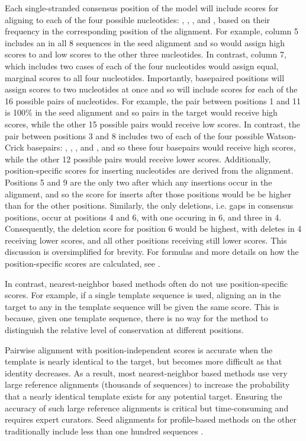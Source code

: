 Each single-stranded consensus position of the model will include
scores for aligning to each of the four possible nucleotides:
, , , and , based on their frequency
in the corresponding position of the alignment. For example, column 5
includes an  in all 8 sequences in the seed alignment and so
would assign high scores to  and low scores to the other three
nucleotides. In contrast, column 7, which includes two cases of each
of the four nucleotides would assign equal, marginal scores to all
four nucleotides.  Importantly, basepaired positions will assign
scores to two nucleotides at once and so will include scores for each
of the 16 possible pairs of nucleotides. For example, the pair between
positions 1 and 11 is 100\%  in the seed alignment and so
 pairs in the target would receive high scores, while the
other 15 possible pairs would receive low scores. In contrast, the
pair between positions 3 and 8 includes two of each of the four
possible Watson-Crick basepairs: , , , and
, and so these four basepairs would receive high scores,
while the other 12 possible pairs would receive lower
scores. Additionally, position-specific scores for inserting
nucleotides are derived from the alignment. Positions 5 and 9 are the
only two after which any insertions occur in the alignment, and so the
score for inserts after those positions would be be higher than for
the other positions. Similarly, the only deletions, i.e. gaps in
consensus positions, occur at positions 4 and 6, with one occuring in
6, and three in 4. Consequently, the deletion score for position 6
would be highest, with deletes in 4 receiving lower scores, and all
other positions receiving still lower scores. This discussion is
oversimplified for brevity. For formulas and more details on how 
the position-specific scores are calculated, see \cite{Durbin98,Nawrocki09}.

In contrast, nearest-neighbor based methods often do not use
position-specific scores. For example, if a single template sequence
is used,  aligning an  in the target to any  in the
template sequence will be given the same score. This is because, given
one template sequence, there is no way for the method to distinguish
the relative level of conservation at different positions.

Pairwise alignment with position-independent scores is accurate when
the template is nearly identical to the target, but becomes more
difficult as that identity decreases. As a result, most
nearest-neighbor based methods use very large reference alignments
(thousands of sequences) to increase the probability that a nearly
identical template exists for any potential target. Ensuring the
accuracy of such large reference alignments is critical 
but time-consuming and requires expert curators. 
Seed alignments for profile-based methods on the other
traditionally include less than one hundred sequences
\cite{Finn10,Gardner09}.

